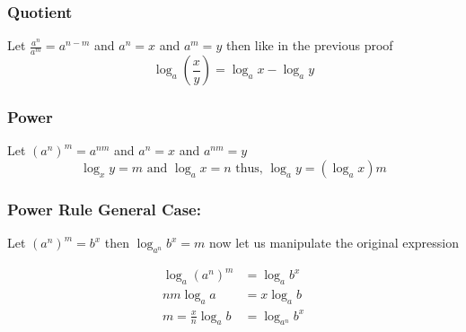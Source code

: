\QED

\subsubsection{Quotient}

Let \(\frac{a^n}{a^m} = a^{n - m}\) and \(a^n = x\) and \(a^m = y\) then like in the previous proof
\[
\log_a \left(\frac{x}{y}\right) = \log_a x - \log_a y
\]
\QED 

\subsubsection{Power}

Let \({(a^n)}^m = a^{nm}\) and \(a^n = x\) and \(a^{nm} = y\)
\[
\log_x y = m \text{ and } \log_a x = n \text{ thus, } \log_a y = (\log_a x )m
\]
\QED

\subsubsection{Power Rule General Case:}

Let \({(a^n)}^m = b^x\) then \(\log_{a^n} b^x = m\) now let us manipulate the original expression

\begin{align*}
\log_a {(a^n)}^m &= \log_a b^x\\
nm \log_a a &= x \log_a b\\
m = \frac{x}{n} \log_a b &=  \log_{a^n} b^x 
\end{align*}

\QED
